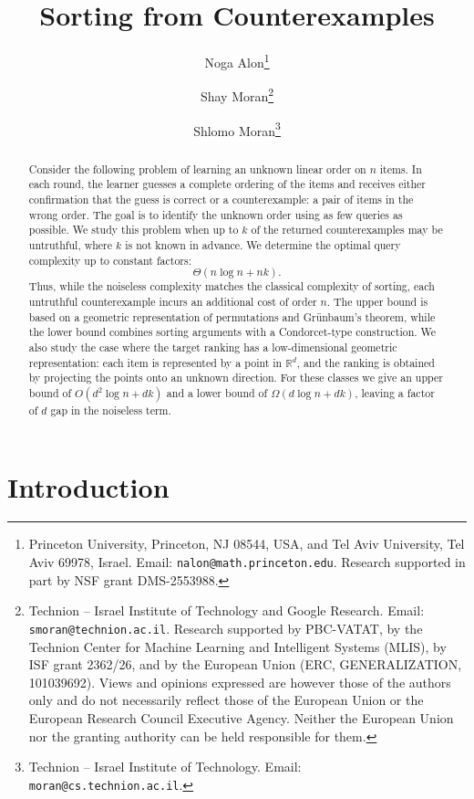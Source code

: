 \documentclass[11pt]{article}
\title{Sorting from Counterexamples}
\author{
Noga Alon\thanks{
Princeton University, Princeton, NJ 08544, USA, and
Tel Aviv University, Tel Aviv 69978, Israel.
Email: \texttt{nalon@math.princeton.edu}.
Research supported in part by NSF grant DMS-2553988.
}
\and
Shay Moran\thanks{
Technion -- Israel Institute of Technology and Google Research.
Email: \texttt{smoran@technion.ac.il}.
Research supported by PBC-VATAT, by the Technion Center for Machine Learning
and Intelligent Systems (MLIS), by ISF grant 2362/26, and by the European
Union (ERC, GENERALIZATION, 101039692).
Views and opinions expressed are however those of the authors only and do not
necessarily reflect those of the European Union or the European Research
Council Executive Agency. Neither the European Union nor the granting
authority can be held responsible for them.
}
\and
Shlomo Moran\thanks{
Technion -- Israel Institute of Technology.
Email: \texttt{moran@cs.technion.ac.il}.
}
}
\date{}
\theoremstyle{definition}
\theoremstyle{remark}
\begin{document}
\maketitle


\begin{abstract}
Consider the following problem of learning an unknown linear order on $n$
items. In each round, the learner guesses a complete ordering of the items and
receives either confirmation that the guess is correct or a counterexample:
a pair of items in the wrong order. The goal is to identify the unknown
order using as few queries as possible. We study this problem when up to $k$
of the returned counterexamples may be untruthful, where $k$ is not known in
advance. We determine the optimal query complexity up to
constant factors:
\[
    \Theta(n\log n + nk).
\]
Thus, while the noiseless complexity matches the classical complexity of
sorting, each untruthful counterexample incurs an additional cost of order
$n$. The upper bound is based on a geometric representation of permutations
and Gr\"unbaum's theorem, while the lower bound combines sorting arguments
with a Condorcet-type construction. We also study the case where the target ranking has a low-dimensional geometric representation: each item is represented by a point in
$\mathbb{R}^d$, and the ranking is obtained by projecting the points onto
an unknown direction. For these classes we give an upper bound of
$O(d^2\log n+dk)$ and a lower bound of $\Omega(d\log n+dk)$, leaving a
factor of $d$ gap in the noiseless term.
\end{abstract}
\section{Introduction}
\end{document}
